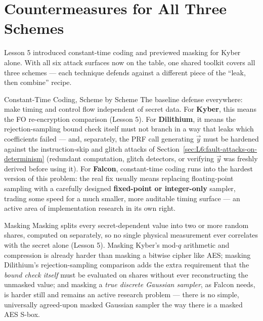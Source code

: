 \section{Countermeasures for All Three Schemes}
\label{sec:L6:countermeasures-for-all-three-schemes}

Lesson 5 introduced constant-time coding and previewed masking for Kyber alone. With all six attack surfaces now on the table, one shared toolkit covers all three schemes --- each technique defends against a different piece of the ``leak, then combine'' recipe.

\begin{rmkbox}{Constant-Time Coding, Scheme by Scheme}
The baseline defense everywhere: make timing and control flow independent of secret data. For \textbf{Kyber}, this means the FO re-encryption comparison (Lesson 5). For \textbf{Dilithium}, it means the rejection-sampling bound check itself must not branch in a way that leaks which coefficients failed --- and, separately, the PRF call generating $\vec y$ must be hardened against the instruction-skip and glitch attacks of Section~\ref{sec:L6:fault-attacks-on-determinism} (redundant computation, glitch detectors, or verifying $\vec y$ was freshly derived before using it). For \textbf{Falcon}, constant-time coding runs into the hardest version of this problem: the real fix usually means replacing floating-point sampling with a carefully designed \textbf{fixed-point or integer-only} sampler, trading some speed for a much smaller, more auditable timing surface --- an active area of implementation research in its own right.
\end{rmkbox}

\begin{rmkbox}{Masking}
Masking splits every secret-dependent value into two or more random shares, computed on separately, so no single physical measurement ever correlates with the secret alone (Lesson 5). Masking Kyber's mod-$q$ arithmetic and compression is already harder than masking a bitwise cipher like AES; masking Dilithium's rejection-sampling comparison adds the extra requirement that the \emph{bound check itself} must be evaluated on shares without ever reconstructing the unmasked value; and masking a \emph{true discrete Gaussian sampler}, as Falcon needs, is harder still and remains an active research problem --- there is no simple, universally agreed-upon masked Gaussian sampler the way there is a masked AES S-box.
\end{rmkbox}

